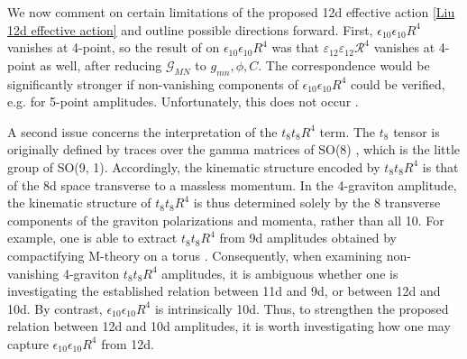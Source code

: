 We now comment on certain limitations of the proposed 12d effective action \eqref{Liu 12d effective action} and outline possible directions forward.
First, $\epsilon_{10}\epsilon_{10}R^4$ vanishes at 4-point, so the result of \cite{Minasian:2015bxa} on $\epsilon_{10}\epsilon_{10}R^4$ was that $\varepsilon_{12}\varepsilon_{12}\mathcal R^4$ vanishes at 4-point as well, after reducing $\mathcal G_{MN}$ to $g_{mn},\phi,C$.
The correspondence would be significantly stronger if non-vanishing components of $\epsilon_{10}\epsilon_{10}R^4$ could be verified, e.g. for 5-point amplitudes.
Unfortunately, this does not occur \cite{Liu:2025uqu}.

A second issue concerns the interpretation of the $t_8t_8 R^4$ term.
The $t_8$ tensor is originally defined by traces over the gamma matrices of SO(8) \cite{Schwarz:1982jn}, which is the little group of SO(9, 1).
Accordingly, the kinematic structure encoded by $t_8t_8R^4$ is that of the 8d space transverse to a massless momentum.
In the 4-graviton amplitude, the kinematic structure of $t_8t_8 R^4$ is thus determined solely by the 8 transverse components of the graviton polarizations and momenta, rather than all 10.
For example, one is able to extract $t_8t_8 R^4$ from 9d amplitudes obtained by compactifying M-theory on a torus \cite{Green:1997as}.
Consequently, when examining non-vanishing 4-graviton $t_8t_8R^4$ amplitudes, it is ambiguous whether one is investigating the established relation between 11d and 9d, or between 12d and 10d.
By contrast, $\epsilon_{10}\epsilon_{10}R^4$ is intrinsically 10d.
Thus, to strengthen the proposed relation between 12d and 10d amplitudes, it is worth investigating how one may capture $\epsilon_{10}\epsilon_{10}R^4$ from 12d.


